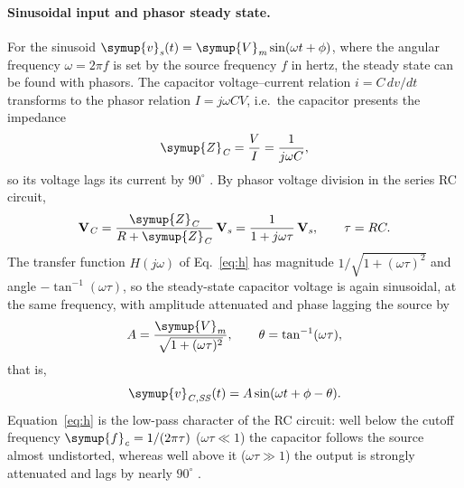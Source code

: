 \documentclass[12pt,a4paper]{article}
\begin{document}
	\paragraph{Sinusoidal input and phasor steady state.}
	For the sinusoid $\symup{v}_{\mathit{s}}(t) = \symup{V}_{\mathit{m}} \sin(\omega t + \phi)$, where the
	angular frequency $\omega = 2\pi f$ is set by the source frequency $f$
	in hertz, the steady state can be found with phasors.  The capacitor voltage--current
	relation $i = C\,dv/dt$ transforms to the phasor relation
	$I = j\omega C V$, i.e.\ the capacitor presents the impedance
	\begin{equation}
		\symup{Z}_{\mathit{C}} = \frac{V}{I} = \frac{1}{j\omega C},
		\label{eq:zc}
	\end{equation}
	so its voltage lags its current by $90^\circ$ \cite{sadiku}.  By
	phasor voltage division in the series RC circuit,
	\begin{equation}
		\mathbf{V}_{\mathit{C}} = \frac{\symup{Z}_{\mathit{C}}}{R + \symup{Z}_{\mathit{C}}}\,\mathbf{V}_{\mathit{s}}
		= \frac{1}{1 + j\omega\tau}\,\mathbf{V}_{\mathit{s}},
		\qquad \tau = RC .
		\label{eq:h}
	\end{equation}
	The transfer function $H(j\omega)$ of
	Eq.~\eqref{eq:h} has magnitude $1/\sqrt{1 + (\omega\tau)^2}$ and
	angle $-\tan^{-1}(\omega\tau)$, so the steady-state capacitor
	voltage is
	again sinusoidal, at the same frequency, with amplitude attenuated
	and phase lagging the source by
	\begin{equation}
		A = \frac{\symup{V}_{\mathit{m}}}{\sqrt{1 + (\omega\tau)^2}}, \qquad
		\theta = \tan^{-1}(\omega\tau),
		\label{eq:amp-lag}
	\end{equation}
	that is,
	\begin{equation}
		\symup{v}_{\mathit{C,SS}}(t) = A \sin(\omega t + \phi - \theta).
		\label{eq:ss}
	\end{equation}
	Equation~\eqref{eq:h} is the low-pass character of the RC circuit:
	well below the cutoff frequency $\symup{f}_{\mathit{c}} = 1/(2\pi\tau)$
	($\omega\tau \ll 1$) the capacitor follows the source almost
	undistorted, whereas well above it ($\omega\tau \gg 1$) the output is
	strongly attenuated and lags by nearly $90^\circ$ \cite{sadiku}.
	
\end{document}
